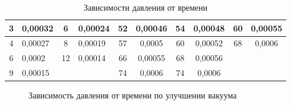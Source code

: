 \documentclass[12pt,a4paper]{article}
\begin{document}
\begin{enumerate}
\begin{table}[!h]
{\begin{tabular}{|c|l|cl|c|c|c|c|cc}
				{\color[HTML]{000000} 3} & {\color[HTML]{000000} 0,00032} & \multicolumn{1}{c|}{{\color[HTML]{000000} 6}} & {\color[HTML]{000000} 0,00024} & {\color[HTML]{000000} 52} & {\color[HTML]{000000} 0,00046} & {\color[HTML]{000000} 54} & {\color[HTML]{000000} 0,00048} & \multicolumn{1}{c|}{{\color[HTML]{000000} 60}} & \multicolumn{1}{c|}{{\color[HTML]{000000} 0,00055}} \\ \hline
				{\color[HTML]{000000} 4} & {\color[HTML]{000000} 0,00027} & \multicolumn{1}{c|}{{\color[HTML]{000000} 8}} & {\color[HTML]{000000} 0,00019} & {\color[HTML]{000000} 57} & {\color[HTML]{000000} 0,0005} & {\color[HTML]{000000} 60} & {\color[HTML]{000000} 0,00052} & \multicolumn{1}{c|}{{\color[HTML]{000000} 68}} & \multicolumn{1}{c|}{{\color[HTML]{000000} 0,0006}} \\ \hline
				{\color[HTML]{000000} 6} & {\color[HTML]{000000} 0,0002} & \multicolumn{1}{c|}{{\color[HTML]{000000} 12}} & {\color[HTML]{000000} 0,00014} & {\color[HTML]{000000} 66} & {\color[HTML]{000000} 0,00055} & {\color[HTML]{000000} 68} & {\color[HTML]{000000} 0,00056} & {\color[HTML]{000000} } & {\color[HTML]{000000} } \\ \cline{1-8}
				{\color[HTML]{000000} 9} & {\color[HTML]{000000} 0,00015} & {\color[HTML]{000000} } & {\color[HTML]{000000} } & {\color[HTML]{000000} 74} & {\color[HTML]{000000} 0,0006} & {\color[HTML]{000000} 74} & {\color[HTML]{000000} 0,0006} & {\color[HTML]{000000} } & {\color[HTML]{000000} } \\ \cline{1-2} \cline{5-8}
			\end{tabular}%
		}
	\caption{Зависимости давления от времени}	
	\end{table}

	\begin{figure}[!h]
		\begin{center}
		\end{center}
		\caption{Зависимость давления от времени по улучшении вакуума}
	\end{figure}


\end{enumerate}
\end{document}
